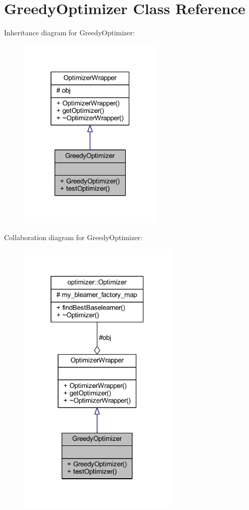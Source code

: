 \hypertarget{class_greedy_optimizer}{}\section{Greedy\+Optimizer Class Reference}
\label{class_greedy_optimizer}


Inheritance diagram for Greedy\+Optimizer\+:\nopagebreak
\begin{figure}[H]
\begin{center}
\leavevmode
\includegraphics[width=196pt]{class_greedy_optimizer__inherit__graph}
\end{center}
\end{figure}


Collaboration diagram for Greedy\+Optimizer\+:\nopagebreak
\begin{figure}[H]
\begin{center}
\leavevmode
\includegraphics[width=217pt]{class_greedy_optimizer__coll__graph}
\end{center}
\end{figure}
